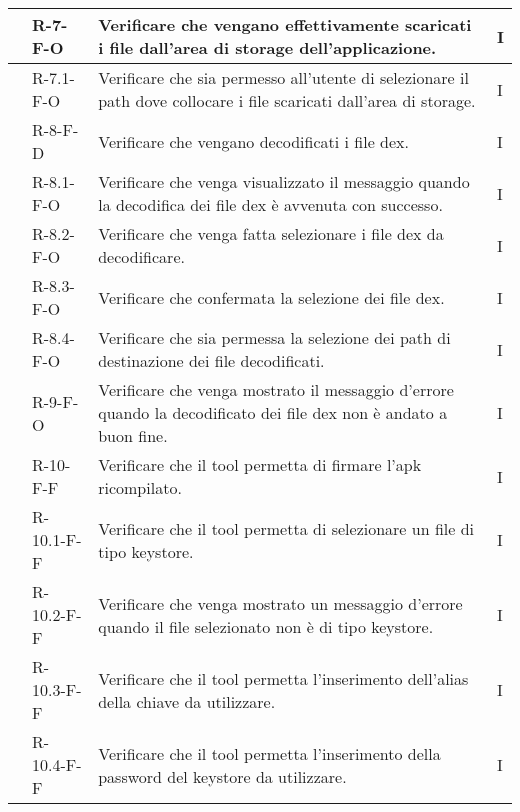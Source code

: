 \begin{longtable}{ | C{2.5cm} |C{2cm} |C{7cm} |C{1.5cm}|}
     & R-7-F-O    & Verificare che vengano effettivamente scaricati i file dall'area di storage dell'applicazione.& I \\\hline
     & R-7.1-F-O  & Verificare che sia permesso all'utente di selezionare il path dove collocare i file scaricati dall'area di storage.& I \\\hline
     & R-8-F-D    & Verificare che vengano decodificati i file dex.& I \\\hline
     & R-8.1-F-O  & Verificare che venga visualizzato il messaggio quando la decodifica dei file dex è avvenuta con successo.& I \\\hline
     & R-8.2-F-O  & Verificare che venga fatta selezionare i file dex da decodificare.& I \\\hline
     & R-8.3-F-O  & Verificare che confermata la selezione dei file dex.& I \\\hline
     & R-8.4-F-O  & Verificare che sia permessa la selezione dei path di destinazione dei file decodificati.& I \\\hline
     & R-9-F-O    & Verificare che venga mostrato il messaggio d'errore quando la decodificato dei file dex non è andato a buon fine.& I \\\hline
     & R-10-F-F   & Verificare che il tool permetta di firmare l'apk ricompilato.& I \\\hline
     & R-10.1-F-F & Verificare che il tool permetta di selezionare un file di tipo keystore.& I \\\hline
     & R-10.2-F-F & Verificare che venga mostrato un messaggio d'errore quando il file selezionato non è di tipo keystore.& I \\\hline
     & R-10.3-F-F & Verificare che il tool permetta l'inserimento dell'alias della chiave da utilizzare.& I \\\hline
     & R-10.4-F-F & Verificare che il tool permetta l'inserimento della password del keystore da utilizzare.& I \\\hline


\end{longtable}
